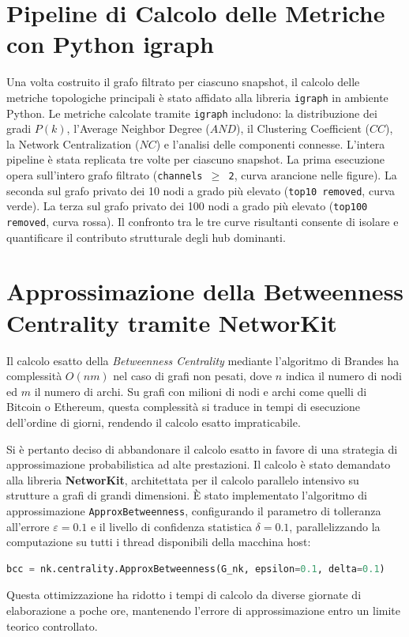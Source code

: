\documentclass[12pt,a4paper,oneside]{book}
\begin{document}
\section{Pipeline di Calcolo delle Metriche con Python igraph}
Una volta costruito il grafo filtrato per ciascuno snapshot, il calcolo delle metriche topologiche principali è stato affidato alla libreria \texttt{igraph} in ambiente Python. Le metriche calcolate tramite \texttt{igraph} includono: la distribuzione dei gradi $P(k)$, l'Average Neighbor Degree ($AND$), il Clustering Coefficient ($CC$), la Network Centralization ($NC$) e l'analisi delle componenti connesse. L'intera pipeline è stata replicata tre volte per ciascuno snapshot. La prima esecuzione opera sull'intero grafo filtrato (\texttt{channels $\ge$ 2}, curva arancione nelle figure). La seconda sul grafo privato dei 10 nodi a grado più elevato (\texttt{top10 removed}, curva verde). La terza sul grafo privato dei 100 nodi a grado più elevato (\texttt{top100 removed}, curva rossa). Il confronto tra le tre curve risultanti consente di isolare e quantificare il contributo strutturale degli hub dominanti.

\section{Approssimazione della Betweenness Centrality tramite NetworKit}
Il calcolo esatto della \textit{Betweenness Centrality} mediante l'algoritmo di Brandes \cite{Brandes2001} ha complessità $O(nm)$ nel caso di grafi non pesati, dove $n$ indica il numero di nodi ed $m$ il numero di archi. Su grafi con milioni di nodi e archi come quelli di Bitcoin o Ethereum, questa complessità si traduce in tempi di esecuzione dell'ordine di giorni, rendendo il calcolo esatto impraticabile.

Si è pertanto deciso di abbandonare il calcolo esatto in favore di una strategia di approssimazione probabilistica ad alte prestazioni. Il calcolo è stato demandato alla libreria \textbf{NetworKit}, architettata per il calcolo parallelo intensivo su strutture a grafi di grandi dimensioni. È stato implementato l'algoritmo di approssimazione \texttt{ApproxBetweenness}, configurando il parametro di tolleranza all'errore $\varepsilon = 0.1$ e il livello di confidenza statistica $\delta = 0.1$, parallelizzando la computazione su tutti i thread disponibili della macchina host:
\begin{lstlisting}[language=Python]
bcc = nk.centrality.ApproxBetweenness(G_nk, epsilon=0.1, delta=0.1)
\end{lstlisting}
Questa ottimizzazione ha ridotto i tempi di calcolo da diverse giornate di elaborazione a poche ore, mantenendo l'errore di approssimazione entro un limite teorico controllato.
\end{document}
